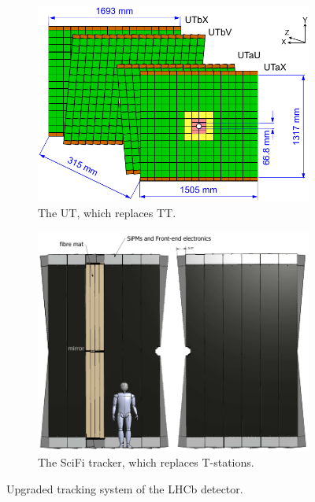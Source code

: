 \begin{figure}[!htb]
    \begin{subfigure}[t]{0.48\textwidth}
        \centering
        \includegraphics[width=\textwidth]{./figs-lhcb-upgrade-overview/tracking/ut_upgrade.pdf}
        \caption{The UT, which replaces TT.}
        \label{fig:ut-upgrade}
    \end{subfigure}
    \hfill
    \begin{subfigure}[t]{0.48\textwidth}
        \centering
        \includegraphics[width=\textwidth]{./figs-lhcb-upgrade-overview/tracking/scifi_upgrade.pdf}
        \caption{The SciFi tracker, which replaces T-stations.}
        \label{fig:scifi-upgrade}
    \end{subfigure}

    \caption{
        Upgraded tracking system of the LHCb detector.
    }
\end{figure}

